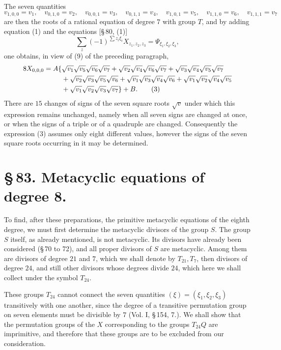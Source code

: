 \documentclass[11pt]{article}
\begin{document}
The seven quantities
\begin{equation}
 v_{1,0,0}=v_1,
 \quad v_{0,1,0}=v_2,
 \quad v_{0,0,1}=v_3,
 \quad v_{0,1,1}=v_4,
 \quad v_{1,0,1}=v_5,
 \quad v_{1,1,0}=v_6,
 \quad v_{1,1,1}=v_7
 \tag{2}
\end{equation}
are then the roots of a rational equation of degree $7$ with group $T$, and by adding equation (1) and the equations [\S\,80, (1)]
\[
 \sum_z(-1)^{\sum z_i\xi_i}X_{z_1,z_2,z_3}=\Psi_{\xi_1,\xi_2,\xi_3},
\]
one obtains, in view of (9) of the preceding paragraph,
\begin{align}
8X_{0,0,0}=A\{&\sqrt{v_1}\sqrt{v_5}\sqrt{v_6}\sqrt{v_7}
+\sqrt{v_2}\sqrt{v_4}\sqrt{v_6}\sqrt{v_7}
+\sqrt{v_3}\sqrt{v_4}\sqrt{v_5}\sqrt{v_7}\notag\\
&+\sqrt{v_2}\sqrt{v_3}\sqrt{v_5}\sqrt{v_6}
+\sqrt{v_1}\sqrt{v_3}\sqrt{v_4}\sqrt{v_6}
+\sqrt{v_1}\sqrt{v_2}\sqrt{v_4}\sqrt{v_5}\notag\\
&+\sqrt{v_1}\sqrt{v_2}\sqrt{v_3}\sqrt{v_7}\}+B.
\tag{3}
\end{align}
There are $15$ changes of signs of the seven square roots $\sqrt v$ under which this expression remains unchanged, namely when all seven signs are changed at once, or when the signs of a triple or of a quadruple are changed. Consequently the expression (3) assumes only eight different values, however the signs of the seven square roots occurring in it may be determined.

\section*{\S\,83. Metacyclic equations of degree 8.}

To find, after these preparations, the primitive metacyclic equations of the eighth degree, we must first determine the metacyclic divisors of the group $S$. The group $S$ itself, as already mentioned, is not metacyclic. Its divisors have already been considered (\S\,70 to 72), and all proper divisors of $S$ are metacyclic. Among them are divisors of degree $21$ and $7$, which we shall denote by $T_{21},T_7$, then divisors of degree $24$, and still other divisors whose degrees divide $24$, which here we shall collect under the symbol $T_{24}$.

These groups $T_{24}$ cannot connect the seven quantities $(\xi)=(\xi_1,\xi_2,\xi_3)$ transitively with one another, since the degree of a transitive permutation group on seven elements must be divisible by $7$ (Vol. I, \S\,154, 7.). We shall show that the permutation groups of the $X$ corresponding to the groups $T_{24}Q$ are imprimitive, and therefore that these groups are to be excluded from our consideration.
\end{document}
